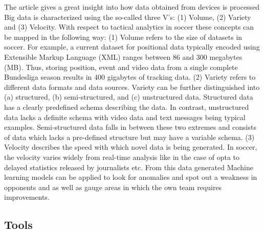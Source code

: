 \documentclass[sigconf]{acmart}
\begin{document}
The article \cite{Rein2016} gives a great insight into how data obtained from devices is processed Big data is characterized using the so-called three V’s: (1) Volume, (2) Variety and (3) Velocity. With respect to tactical analytics in soccer these concepts can be mapped in the following way:\newline
(1) Volume refers to the size of datasets in soccer. For example, a current dataset for positional data typically encoded using Extensible Markup Language (XML) ranges between 86 and 300 megabytes (MB). Thus, storing position, event and video data from a single complete Bundesliga season results in 400 gigabytes of tracking data\cite{Rein2016}.\newline
(2) Variety refers to different data formats and data sources. Variety can be further distinguished into (a) structured, (b) semi-structured, and (c) unstructured data. Structured data has a clearly predefined schema describing the data. In contrast, unstructured data lacks a definite schema with video data and text messages being typical examples. Semi-structured data falls in between these two extremes and consists of data which lacks a pre-defined structure but may have a variable schema\cite{Rein2016}. \newline
(3) Velocity describes the speed with which novel data is being generated. In soccer, the velocity varies widely from real-time analysis like in the case of opta to delayed statistics released by journalists etc\cite{Rein2016}.
From this data generated Machine learning models can be applied to look for anomalies and spot out a weakness in opponents and as well as gauge areas in which the own team requires improvements.


\subsection{Tools}
\end{document}

